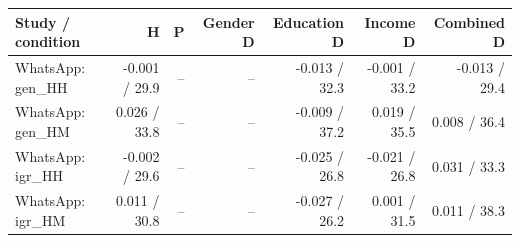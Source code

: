 
\begin{tabular}{lrrrrrr}
\toprule
Study / condition & H & P & Gender D & Education D & Income D & Combined D\\
\midrule
WhatsApp: gen\_HH & -0.001 / 29.9 & -- & -- & -0.013 / 32.3 & -0.001 / 33.2 & -0.013 / 29.4\\
WhatsApp: gen\_HM & 0.026 / 33.8 & -- & -- & -0.009 / 37.2 & 0.019 / 35.5 & 0.008 / 36.4\\
WhatsApp: igr\_HH & -0.002 / 29.6 & -- & -- & -0.025 / 26.8 & -0.021 / 26.8 & 0.031 / 33.3\\
WhatsApp: igr\_HM & 0.011 / 30.8 & -- & -- & -0.027 / 26.2 & 0.001 / 31.5 & 0.011 / 38.3\\
\bottomrule
\end{tabular}
